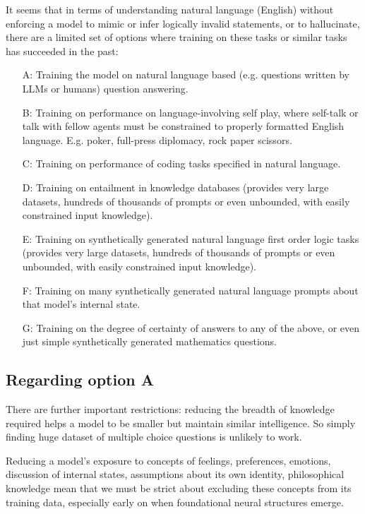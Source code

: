 \documentclass{article}
\begin{document}
It seems that in terms of understanding natural language (English) without enforcing a model to mimic or infer logically invalid statements, or to hallucinate, there are a limited set of options where training on these tasks or similar tasks has succeeded in the past:
\begin{itemize}
    \item[A:] Training the model on natural language based (e.g. questions written by LLMs or humans) question answering.
    \item[B:] Training on performance on language-involving self play, where self-talk or talk with fellow agents must be constrained to properly formatted English language. E.g. poker, full-press diplomacy, rock paper scissors.
    \item[C:] Training on performance of coding tasks specified in natural language.
    \item[D:] Training on entailment in knowledge databases (provides very large datasets, hundreds of thousands of prompts or even unbounded, with easily constrained input knowledge).
    \item[E:] Training on synthetically generated natural language first order logic tasks (provides very large datasets, hundreds of thousands of prompts or even unbounded, with easily constrained input knowledge).
    \item[F:] Training on many synthetically generated natural language prompts about that model's internal state.
    \item[G:] Training on the degree of certainty of answers to any of the above, or even just simple synthetically generated mathematics questions.
\end{itemize}

\subsection{Regarding option A}

There are further important restrictions: reducing the breadth of knowledge required helps a model to be smaller but maintain similar intelligence. So simply finding huge dataset of multiple choice questions is unlikely to work.

Reducing a model's exposure to concepts of feelings, preferences, emotions, discussion of internal states, assumptions about its own identity, philosophical knowledge mean that we must be strict about excluding these concepts from its training data, especially early on when foundational neural structures emerge.
\end{document}

